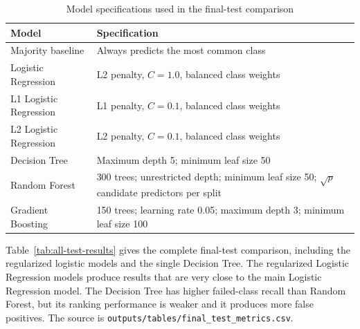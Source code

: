 \documentclass[11pt,a4paper]{article}
\begin{document}
\begin{table}[H]
  \centering
  \caption{Model specifications used in the final-test comparison}
  \label{tab:model-settings}
  \small
  \begin{tabular}{p{}p{}}
    \toprule
    Model & Specification \\
    \midrule
    Majority baseline & Always predicts the most common class \\
    Logistic Regression & L2 penalty, $C=1.0$, balanced class weights \\
    L1 Logistic Regression & L1 penalty, $C=0.1$, balanced class weights \\
    L2 Logistic Regression & L2 penalty, $C=0.1$, balanced class weights \\
    Decision Tree & Maximum depth 5; minimum leaf size 50 \\
    Random Forest & 300 trees; unrestricted depth; minimum leaf size 50;
      $\sqrt{p}$ candidate predictors per split \\
    Gradient Boosting & 150 trees; learning rate 0.05; maximum depth 3;
      minimum leaf size 100 \\
    \bottomrule
  \end{tabular}
\end{table}

Table~\ref{tab:all-test-results} gives the complete final-test comparison,
including the regularized logistic models and the single Decision Tree. The
regularized Logistic Regression models produce results that are very close to
the main Logistic Regression model. The Decision Tree has higher failed-class
recall than Random Forest, but its ranking performance is weaker and it
produces more false positives. The source is
\texttt{outputs/tables/final\_test\_metrics.csv}.

\begin{table}[H]
  \centering
  \caption{Complete final-test model comparison}
  \label{tab:all-test-results}
  \small
\end{table}
\end{document}
